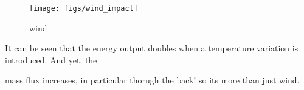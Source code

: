 \begin{figure}[htb!]
\centering
 \texttt{[image: figs/wind\_impact]}
 \caption{wind} 
 \label{fig:wind_impact}  
\end{figure}

It can be seen that the energy output doubles when a temperature
variation is introduced. And yet, the 

mass flux increases, in particular thorugh the back! so its more than
just wind.



%
% 

